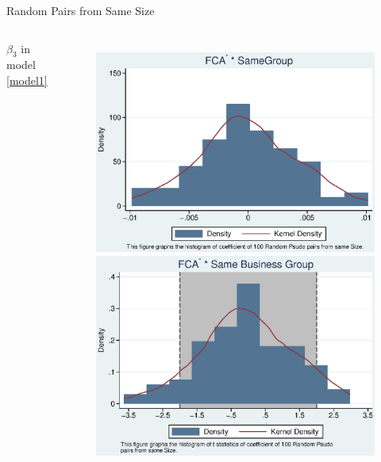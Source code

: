\documentclass{beamer}
\begin{document}
	
	
	
	\begin{frame}{Random Pairs from Same Size}
		
		\begin{columns}\centering
			\column{\textwidth}
			\begin{center}
				$ \beta_3 $ in model \ref{model1}
			\end{center}
			\begin{figure}
				\centering
				\includegraphics[width=0.45\linewidth]{SizePseudoSBFCA.eps}
				\includegraphics[width=0.45\linewidth]{SizePseudoSBFCA_t.eps}
			\end{figure}
%			
			
		\end{columns}
	\end{frame}
	
\end{document}
